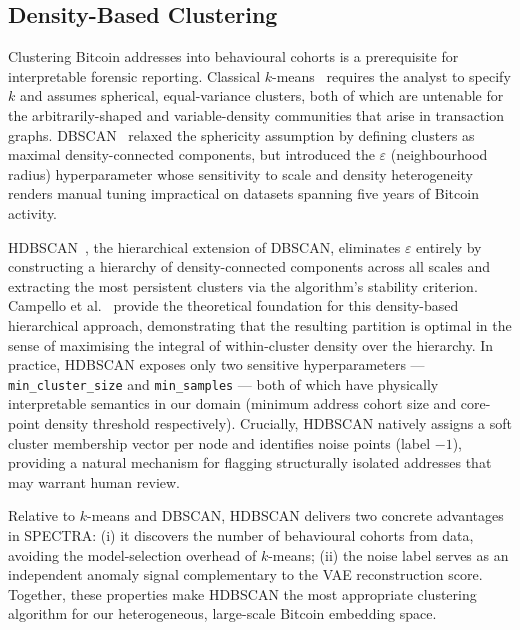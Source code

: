 \documentclass[journal]{IEEEtran}
\begin{document}
\subsection{Density-Based Clustering}
\label{subsec:clustering}

Clustering Bitcoin addresses into behavioural cohorts is a prerequisite for
interpretable forensic reporting.  Classical $k$-means~\cite{Lloyd1982}
requires the analyst to specify $k$ and assumes spherical, equal-variance
clusters, both of which are untenable for the arbitrarily-shaped and variable-density
communities that arise in transaction graphs.  DBSCAN~\cite{Ester1996}
relaxed the sphericity assumption by defining clusters as maximal
density-connected components, but introduced the $\varepsilon$ (neighbourhood
radius) hyperparameter whose sensitivity to scale and density heterogeneity
renders manual tuning impractical on datasets spanning five years of Bitcoin
activity.

HDBSCAN~\cite{McInnes2017}, the hierarchical extension of DBSCAN, eliminates
$\varepsilon$ entirely by constructing a hierarchy of density-connected
components across all scales and extracting the most persistent clusters via the
algorithm's stability criterion.  Campello et al.~\cite{Campello2013} provide
the theoretical foundation for this density-based hierarchical approach,
demonstrating that the resulting partition is optimal in the sense of maximising
the integral of within-cluster density over the hierarchy.  In practice,
HDBSCAN exposes only two sensitive hyperparameters --- \texttt{min\_cluster\_size}
and \texttt{min\_samples} --- both of which have physically interpretable
semantics in our domain (minimum address cohort size and core-point density
threshold respectively).  Crucially, HDBSCAN natively assigns a soft cluster
membership vector per node and identifies noise points (label $-1$), providing
a natural mechanism for flagging structurally isolated addresses that may
warrant human review.

Relative to $k$-means and DBSCAN, HDBSCAN delivers two concrete advantages in
SPECTRA: (i) it discovers the number of behavioural cohorts from data, avoiding
the model-selection overhead of $k$-means; (ii) the noise label serves as an
independent anomaly signal complementary to the VAE reconstruction score.
Together, these properties make HDBSCAN the most appropriate clustering
algorithm for our heterogeneous, large-scale Bitcoin embedding space.
\end{document}
